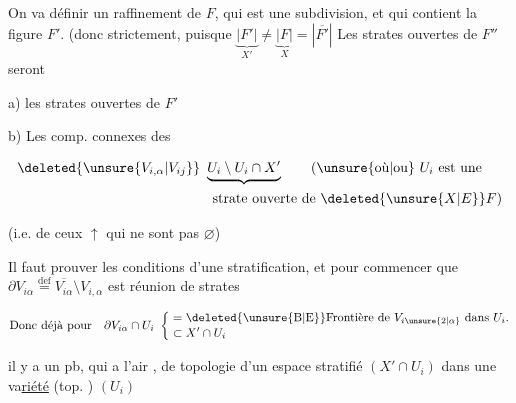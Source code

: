 On va définir un raffinement   de $F$, qui est  une subdivision, et qui contient la figure $F'$. (donc strictement, puisque $\underbrace{|F'|}_{X'}\neq\underbrace{|F|}_{X}=|\overline{F'}|$ Les  strates ouvertes de $F''$ seront

a) les strates ouvertes  de $F'$

b) Les comp. connexes  des

\[
\begin{aligned}
&\deleted{\unsure{V_{i,\alpha}|V_{ij}}}\ \underbrace{U_i\setminus U_i\cap X'}\qquad \text{(\unsure{où|ou} } U_i \text{ est une}\\
&\hspace{14em}\text{strate ouverte de } \deleted{\unsure{X|E}}F\text{)}
\end{aligned}
\]

(i.e. de  ceux $\uparrow$ qui ne sont pas $\varnothing$)

 Il faut prouver les conditions d'une stratification, et pour commencer que $\partial V_{i\alpha}\overset{\mathrm{def}}{=}\overline{V_{i\alpha}}\setminus V_{i,\alpha}$ est réunion de strates

\[
\text{Donc déjà pour}\quad \partial V_{i\alpha}\cap U_i\ \left\{\begin{aligned}&=\text{\deleted{\unsure{B|E}}Frontière de } V_{i\unsure{2|\alpha}}\text{ dans }U_i\text{.}\\[-2pt]&\subset X'\cap U_i\end{aligned}\right.
\]

il y a un pb, qui a l'air , de topologie d'un espace stratifié $(X'\cap U_i)$  dans une va\uline{riété} (top.  ) $(U_i)$
